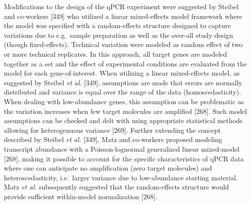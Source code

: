 \documentclass[twoside,10pt]{gihclass} %
\begin{document}
Modifications to the design of the qPCR experiment were suggested by Steibel and co-workers {[}349{]} who utilized a linear mixed-effects model framework where the model was specified with a random-effects structure designed to capture variations due to e.g.~sample preparation as well as the over-all study design (though fixed-effects).
Technical variation were modeled as random effect of two or more technical replicates.
In this approach, all target genes are modeled together as a set and the effect of experimental conditions are evaluated from the model for each gene-of-interest.
When utilizing a linear mixed-effects model, as suggested by Steibel \emph{et al.} {[}349{]}, assumptions are made that errors are normally distributed and variance is equal over the range of the data (homoscedasticity).
When dealing with low-abundance genes, this assumption can be problematic as the variation increases when few target molecules are amplified {[}268{]}.
Such model assumptions can be checked and delt with using appropriate statistical methods allowing for heterogenuous variance {[}269{]}.
Further extending the concept described by Steibel \emph{et al.} {[}349{]}, Matz and co-workers proposed modeling transcript abundance with a Poisson-lognormal generalized linear mixed-model {[}268{]}, making it possible to account for the specific characteristics of qPCR data where one can anticipate no amplification (zero target molecules) and heteroscedasticity, i.e.~larger variance due to low-abundance starting material.
Matz \emph{et al.} subsequently suggested that the random-effects structure would provide sufficient within-model normalization {[}268{]}.
\end{document}
